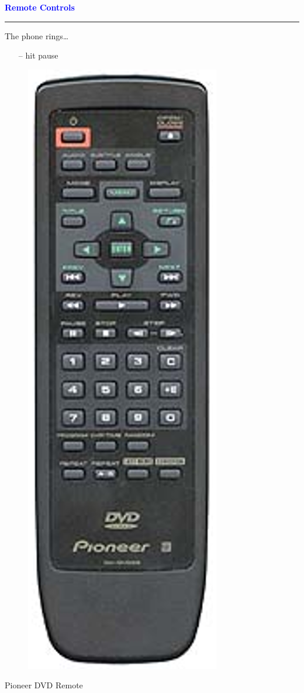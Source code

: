 \documentclass[pdf]{beamer}
\begin{document}
\begin{frame}
    \textcolor{Blue}{\textbf{\Large{Remote Controls}}}
    \textcolor{red}{\rule{10cm}{1mm}}

    {\large \textcolor{black}{}The phone rings…}
    {\begin{itemize}
      \item[\textcolor{black}{--}] {\normalsize hit pause}
    \end{itemize}}
    
    \begin{figure}
   	\includegraphics[scale=0.3]{13_remote.png}
    \end{figure}

	{\normalsize Pioneer DVD Remote}

\end{frame}
\end{document}

